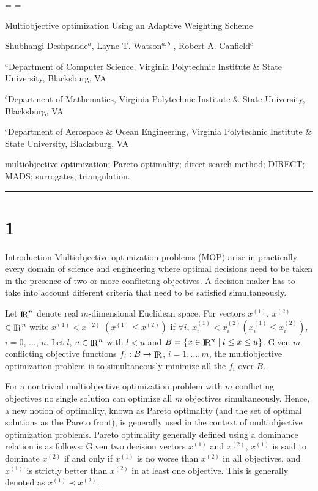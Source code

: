 \rn \AD
\rn \ASZ
\rn \ASZI
\rn \C
\rn \D
\rn \DPAM
\rn \DT
\rn \DWC
\rn \E
\rn \GF
\rn \GSG
\rn \HWRSVJBT
\rn \JPS
\rn \KWT
\rn \MM
\rn \RKW
\rn \TZWBIB
\rn \VL
\rn \WCSF
\rn \WIHM

\headline={\hfil}
\footline={\hfil}

\centerline{\bfXIV Multiobjective optimization Using an Adaptive Weighting Scheme}
\vskip 1.2pc
\centerline{\rmXII Shubhangi Deshpande{$^a$}, Layne T. Watson{$^{a,b}$
}, Robert A. Canfield$^c$}
\smallskip
\centerline{\rmVIII $^a$Department of Computer Science, Virginia Polytechnic 
Institute \& State University, Blacksburg, VA}
\centerline{\rmVIII $^b$Department of Mathematics, Virginia Polytechnic 
Institute \& State University, Blacksburg, VA}
\centerline{\rmVIII $^c$Department of Aerospace \& Ocean Engineering, Virginia 
Polytechnic Institute \& State University, Blacksburg, VA}
\bigskip

\smallskip
\noindent 
\bigskip{} multiobjective optimization; Pareto 
optimality; direct search method; DIRECT; MADS; surrogates; triangulation.
\smallskip
\hrule
\smallskip
%
%

\section{1}{Introduction}%
Multiobjective optimization problems (MOP) arise in practically every domain 
of science and engineering where optimal decisions need to be taken in 
the presence of two or more conflicting objectives. A decision maker has to 
take into account different criteria that need to be satisfied
simultaneously.

Let $\mathop{\rm I}\!\!\mathop{\rm R}\nolimits^n$ denote real $m$-dimensional Euclidean space. For vectors $x^{(1)}$, 
$x^{(2)}$ $\in \mathop{\rm I}\!\!\mathop{\rm R}\nolimits^n$ write $x^{(1)} < x^{(2)}$ $(x^{(1)}\le x^{(2)})$ if 
$\forall i$, $x^{(1)}_i<x^{(2)}_i (x^{(1)}_i\le x^{(2)}_i)$, $i=0$, $\ldots$, 
$n$. Let $l$, $u \in \mathop{\rm I}\!\!\mathop{\rm R}\nolimits^n$ with $l < u$ and $B = \{ x \in \mathop{\rm I}\!\!\mathop{\rm R}\nolimits^n \mid l\le x\le 
u\}$. Given $m$ conflicting objective functions $f_i: B \to \mathop{\rm I}\!\!\mathop{\rm R}\nolimits$, $i=1,\ldots,m$, 
the multiobjective optimization problem is to simultaneously minimize all the 
$f_i$ over $B$.

For a nontrivial multiobjective optimization problem with $m$ conflicting 
objectives no single solution can optimize all $m$ objectives simultaneously. 
Hence, a new notion of optimality, known as Pareto optimality (and the set of 
optimal solutions as the Pareto front), is generally used in the context of
multiobjective optimization problems. Pareto optimality generally defined using
a dominance relation is as follows: Given two decision vectors $x^{(1)}$ and
$x^{(2)}$, $x^{(1)}$ is said to dominate $x^{(2)}$ if and only if $x^{(1)}$ is
no worse than $x^{(2)}$ in all objectives, and $x^{(1)}$ is strictly better
than $x^{(2)}$ in at least one objective. This is generally denoted as
$x^{(1)}\prec x^{(2)}$.


